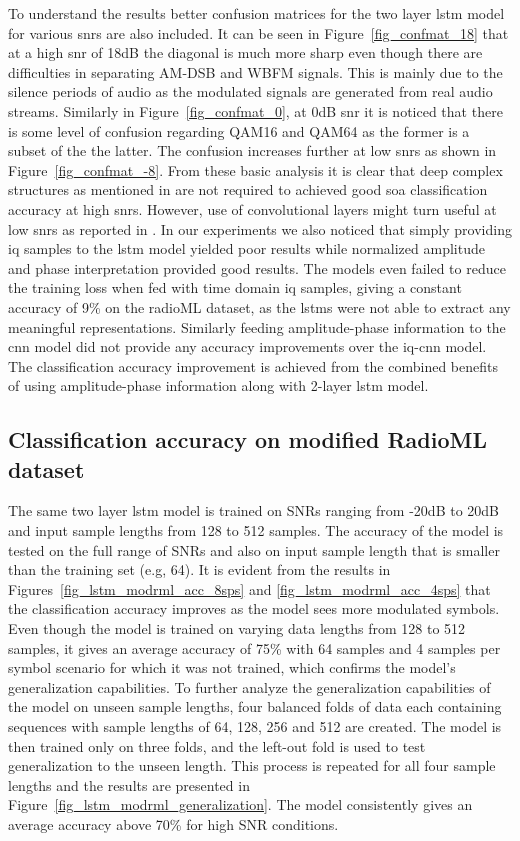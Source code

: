 To understand the results better confusion matrices for the two layer \ac{lstm} model for various \ac{snr}s are also included. It can be seen in Figure~\ref{fig_confmat_18} that at a high \ac{snr} of 18dB the diagonal is much more sharp even though there are difficulties in separating AM-DSB and WBFM signals. This is mainly due to the silence periods of audio as the modulated signals are generated from real audio streams.  Similarly in Figure~\ref{fig_confmat_0}, at 0dB \ac{snr} it is noticed that there is some level of confusion regarding QAM16 and QAM64 as the former is a subset of the the latter. The confusion increases further at low \ac{snr}s as shown in Figure~\ref{fig_confmat_-8}. From these basic analysis it is clear that deep complex structures as mentioned in \cite{baseline} are not required to achieved good \ac{soa} classification accuracy at high \ac{snr}s. However, use of convolutional layers might turn useful at low \ac{snr}s as reported in \cite{baseline}. In our experiments we also noticed that simply providing \ac{iq} samples to the \ac{lstm} model yielded poor results while normalized amplitude and phase interpretation provided good results. The models even failed to reduce the training loss when fed with time domain \ac{iq} samples, giving a constant accuracy of 9\% on the radioML dataset, as the \ac{lstm}s were not able to extract any meaningful representations. Similarly feeding amplitude-phase information to the \ac{cnn} model did not provide any accuracy improvements over the \ac{iq}-\ac{cnn} model. The classification accuracy improvement is achieved from the combined benefits of using amplitude-phase information along with 2-layer \ac{lstm} model.

\subsection{Classification accuracy on modified RadioML dataset}
The same two layer \ac{lstm} model is trained on SNRs ranging from -20dB to 20dB and input sample lengths from 128 to 512 samples. The accuracy of the model is tested on the full range of SNRs and also on input sample length that is smaller than the training set (e.g, 64). It is evident from the results in Figures~\ref{fig_lstm_modrml_acc_8sps} and \ref{fig_lstm_modrml_acc_4sps} that the classification accuracy improves as the model sees more modulated symbols. Even though the model is trained on varying data lengths from 128 to 512 samples, it gives an average accuracy of 75\% with 64 samples and 4 samples per symbol scenario for which it was not trained, which confirms the model's generalization capabilities. To further analyze the generalization capabilities of the model on unseen sample lengths, four balanced folds of data each containing sequences with sample lengths of 64, 128, 256 and 512 are created. The model is then trained only on three folds, and the left-out fold is used to test generalization to the unseen length. This process is repeated for all four sample lengths and the results are presented in Figure~\ref{fig_lstm_modrml_generalization}. The model consistently gives an average accuracy above 70\% for high SNR conditions. 


